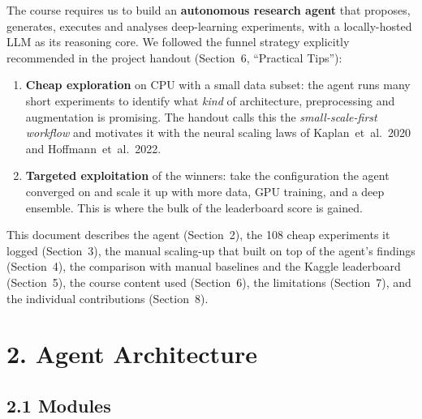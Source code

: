\documentclass[11pt,a4paper]{article}
\begin{document}
The course requires us to build an \textbf{autonomous research agent} that proposes, generates, executes and analyses deep-learning experiments, with a locally-hosted LLM as its reasoning core. We followed the funnel strategy explicitly recommended in the project handout (Section~6, ``Practical Tips''):
\begin{enumerate}
\item \textbf{Cheap exploration} on CPU with a small data subset: the agent runs many short experiments to identify what \emph{kind} of architecture, preprocessing and augmentation is promising. The handout calls this the \emph{small-scale-first workflow} and motivates it with the neural scaling laws of Kaplan~et~al.~2020 and Hoffmann~et~al.~2022.
\item \textbf{Targeted exploitation} of the winners: take the configuration the agent converged on and scale it up with more data, GPU training, and a deep ensemble. This is where the bulk of the leaderboard score is gained.
\end{enumerate}
This document describes the agent (Section~2), the 108 cheap experiments it logged (Section~3), the manual scaling-up that built on top of the agent's findings (Section~4), the comparison with manual baselines and the Kaggle leaderboard (Section~5), the course content used (Section~6), the limitations (Section~7), and the individual contributions (Section~8).

\section*{2. Agent Architecture}

\subsection*{2.1 Modules}
\end{document}

